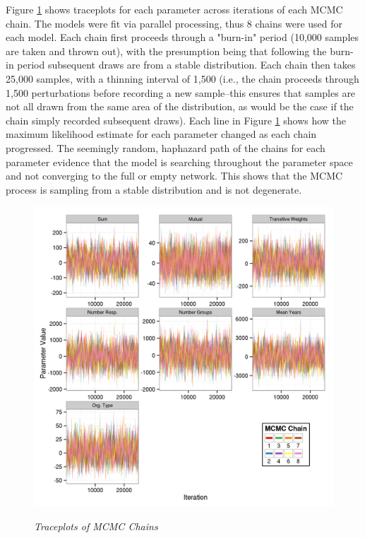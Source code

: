 \documentclass[12pt,a4paper,titlepage]{article}
\begin{document}
Figure \ref{figure:traceplots} shows traceplots for each parameter across iterations of each MCMC chain. The models were fit via parallel processing, thus 8 chains were used for each model. Each chain first proceeds through a "burn-in" period (10,000 samples are taken and thrown out), with the presumption being that following the burn-in period subsequent draws are from a stable distribution. Each chain then takes 25,000 samples, with a thinning interval of 1,500 (i.e., the chain proceeds through 1,500 perturbations before recording a new sample--this ensures that samples are not all drawn from the same area of the distribution, as would be the case if the chain simply recorded subsequent draws). Each line in Figure \ref{figure:traceplots} shows how the maximum likelihood estimate for each parameter changed as each chain progressed. The seemingly random, haphazard path of the chains for each parameter evidence that the model is searching throughout the parameter space and not converging to the full or empty network. This shows that the MCMC process is sampling from a stable distribution and is not degenerate.

\begin{figure}[!ht]
\caption{\textit{Traceplots of MCMC Chains}}
\graphicspath{ {`/Users/TScott/Google\space Drive/elwha/PSJ_Submission/Version3'}}
\noindent
\includegraphics[width=6.5in]
{traceplotdu}
\label{figure:traceplots}
\end{figure}
\end{document}
